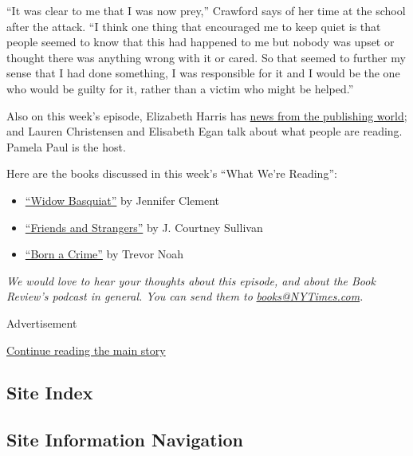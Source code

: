 ``It was clear to me that I was now prey,'' Crawford says of her time at
the school after the attack. ``I think one thing that encouraged me to
keep quiet is that people seemed to know that this had happened to me
but nobody was upset or thought there was anything wrong with it or
cared. So that seemed to further my sense that I had done something, I
was responsible for it and I would be the one who would be guilty for
it, rather than a victim who might be helped.''

Also on this week's episode, Elizabeth Harris has
\href{https://www.nytimes3xbfgragh.onion/2020/07/15/books/book-publishing-leadership.html}{news
from the publishing world}; and Lauren Christensen and Elisabeth Egan
talk about what people are reading. Pamela Paul is the host.

Here are the books discussed in this week's ``What We're Reading'':

\begin{itemize}
\item
  \href{https://www.penguinrandomhouse.com/books/246904/widow-basquiat-by-jennifer-clement/}{``Widow
  Basquiat''} by Jennifer Clement
\item
  \href{https://www.nytimes3xbfgragh.onion/2020/06/26/books/review/friends-and-strangers-j-courtney-sullivan.html}{``Friends
  and Strangers''} by J. Courtney Sullivan
\item
  \href{https://www.nytimes3xbfgragh.onion/2016/11/28/books/review-born-a-crime-trevor-noahs-raw-account-of-life-under-apartheid.html}{``Born
  a Crime''} by Trevor Noah
\end{itemize}

\emph{We would love to hear your thoughts about this episode, and about
the Book Review's podcast in general. You can send them to}
\href{mailto:books@NYTimes.com}{\emph{books@NYTimes.com}}\emph{.}

Advertisement

\protect\hyperlink{after-bottom}{Continue reading the main story}

\hypertarget{site-index}{%
\subsection{Site Index}\label{site-index}}

\hypertarget{site-information-navigation}{%
\subsection{Site Information
Navigation}\label{site-information-navigation}}

